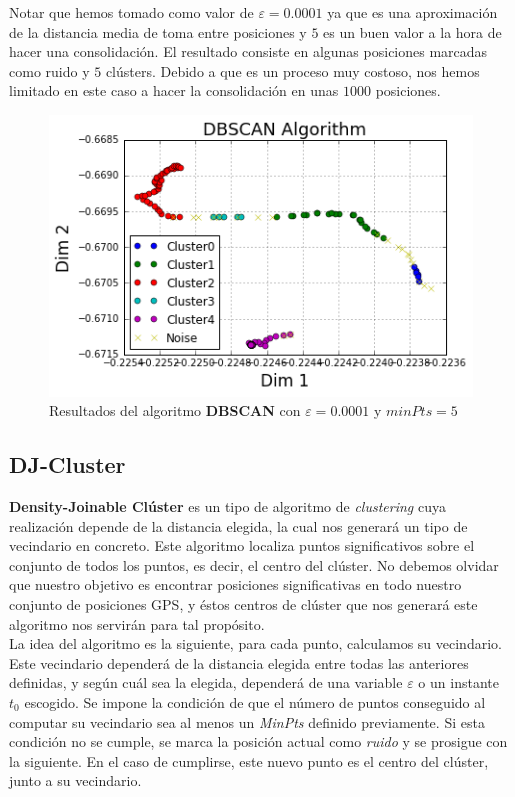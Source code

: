 \documentclass[a4paper, 12pt]{article}
\begin{document}
Notar que hemos tomado como valor de $\varepsilon = 0.0001$ ya que es una aproximaci\'on de la distancia media de toma entre posiciones y $5$ es un buen valor a la hora de hacer una consolidaci\'on. El resultado consiste en algunas posiciones marcadas como ruido y $5$ cl\'usters. Debido a que es un proceso muy costoso, nos hemos limitado en este caso a hacer la consolidaci\'on en unas $1000$ posiciones.\\

\begin{figure}[H]
	\begin{center}
	\includegraphics[scale=.7]{dbscan_2_0.png}
	\end{center}
	\caption{Resultados del algoritmo \textbf{DBSCAN} con $\varepsilon = 0.0001$ y $minPts = 5$}
\end{figure}


\subsection{DJ-Cluster}

\textbf{Density-Joinable Cl\'uster}\cite{importantPlaces} es un tipo de algoritmo de \textit{clustering} cuya realizaci\'on depende de la distancia elegida, la cual nos generar\'a un tipo de vecindario en concreto. Este algoritmo localiza puntos significativos sobre el conjunto de todos los puntos, es decir, el centro del cl\'uster. No debemos olvidar que nuestro objetivo es encontrar posiciones significativas en todo nuestro conjunto de posiciones GPS, y \'estos centros de cl\'uster que nos generar\'a este algoritmo nos servir\'an para tal prop\'osito. \\

La idea del algoritmo es la siguiente, para cada punto, calculamos su vecindario. Este vecindario depender\'a de la distancia elegida entre todas las anteriores definidas, y seg\'un cu\'al sea la elegida, depender\'a de una variable $\varepsilon$ o un instante $t_0$ escogido. Se impone la condici\'on de que el n\'umero de puntos conseguido al computar su vecindario sea al menos un \textit{MinPts} definido previamente. Si esta condici\'on no se cumple, se marca la posici\'on actual como \textit{ruido} y se prosigue con la siguiente. En el caso de cumplirse, este nuevo punto es el centro del cl\'uster, junto a su vecindario.  \\
\end{document}
